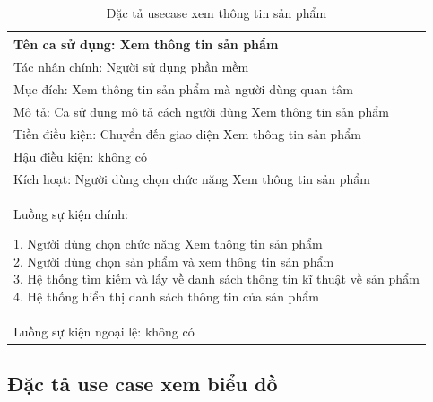 \documentclass[../DoAn.tex]{subfiles}
\begin{document}
\begin{table}[H]
\centering{}
    \begin{tabular}{|l|}
    \hline
    Tên ca sử dụng: Xem thông tin sản phẩm \\
    \hline
    Tác nhân chính: Người sử dụng phần mềm\\
    \hline
    Mục đích: Xem thông tin sản phẩm mà người dùng quan tâm\\
    \hline
    Mô tả: Ca sử dụng mô tả cách người dùng Xem thông tin sản phẩm\\
    \hline
    Tiền điều kiện: Chuyển đến giao diện Xem thông tin sản phẩm\\
    \hline
    Hậu điều kiện: không có\\
    \hline
    Kích hoạt: Người dùng chọn chức năng Xem thông tin sản phẩm\\
    \hline
    \makecell{Luồng sự kiện chính: \\
    
    1. Người dùng chọn chức năng Xem thông tin sản phẩm
    \\
    2. Người dùng chọn sản phẩm và xem thông tin sản phẩm
    \\
    3. Hệ thống tìm kiếm và lấy về danh sách thông tin kĩ thuật về sản phẩm
    \\
    4. Hệ thống hiển thị danh sách thông tin của sản phẩm}
    \\
    \hline
    Luồng sự kiện ngoại lệ: không có
    \\
    \hline
    \end{tabular}
    \caption{Đặc tả usecase xem thông tin sản phẩm}
    \label{fig:my_label}
\end{table}

\hfill
\subsection{Đặc tả use case xem biểu đồ}
\end{document}
